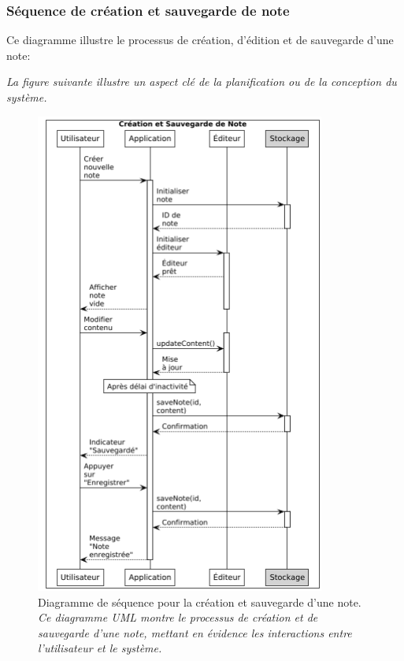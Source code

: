 \subsubsection{Séquence de création et sauvegarde de note}

Ce diagramme illustre le processus de création, d'édition et de sauvegarde d'une note:

\noindent
\textit{La figure suivante illustre un aspect clé de la planification ou de la conception du système.}
\begin{figure}[H]
    \centering
    \includegraphics[width=0.85\textwidth]{assets/docs/voicenotion_sequence_save.png}
    \caption{Diagramme de séquence pour la création et sauvegarde d'une note. \newline\textit{Ce diagramme UML montre le processus de création et de sauvegarde d'une note, mettant en évidence les interactions entre l'utilisateur et le système.}}
    \label{fig:sequence_save_note}
\end{figure}

